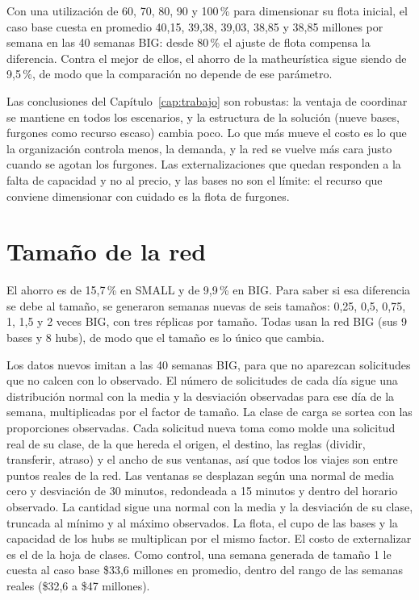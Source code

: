  Con una utilización de 60, 70, 80, 90 y 100\,\% para dimensionar su flota inicial, el caso base cuesta en promedio 40,15, 39,38, 39,03, 38,85 y 38,85 millones por semana en las 40 semanas BIG: desde 80\,\% el ajuste de flota compensa la diferencia. Contra el mejor de ellos, el ahorro de la matheurística sigue siendo de 9,5\,\%, de modo que la comparación no depende de ese parámetro.

 Las conclusiones del Capítulo~\ref{cap:trabajo} son robustas: la ventaja de coordinar se mantiene en todos los escenarios, y la estructura de la solución (nueve bases, furgones como recurso escaso) cambia poco. Lo que más mueve el costo es lo que la organización controla menos, la demanda, y la red se vuelve más cara justo cuando se agotan los furgones. Las externalizaciones que quedan responden a la falta de capacidad y no al precio, y las bases no son el límite: el recurso que conviene dimensionar con cuidado es la flota de furgones.

\section{Tamaño de la red}\label{sec:tamano}

El ahorro es de 15,7\,\% en SMALL y de 9,9\,\% en BIG. Para saber si esa diferencia se debe al tamaño, se generaron semanas nuevas de seis tamaños: 0,25, 0,5, 0,75, 1, 1,5 y 2 veces BIG, con tres réplicas por tamaño. Todas usan la red BIG (sus 9 bases y 8 hubs), de modo que el tamaño es lo único que cambia.

 Los datos nuevos imitan a las 40 semanas BIG, para que no aparezcan solicitudes que no calcen con lo observado. El número de solicitudes de cada día sigue una distribución normal con la media y la desviación observadas para ese día de la semana, multiplicadas por el factor de tamaño. La clase de carga se sortea con las proporciones observadas. Cada solicitud nueva toma como molde una solicitud real de su clase, de la que hereda el origen, el destino, las reglas (dividir, transferir, atraso) y el ancho de sus ventanas, así que todos los viajes son entre puntos reales de la red. Las ventanas se desplazan según una normal de media cero y desviación de 30 minutos, redondeada a 15 minutos y dentro del horario observado. La cantidad sigue una normal con la media y la desviación de su clase, truncada al mínimo y al máximo observados. La flota, el cupo de las bases y la capacidad de los hubs se multiplican por el mismo factor. El costo de externalizar es el de la hoja de clases. Como control, una semana generada de tamaño 1 le cuesta al caso base \$33,6 millones en promedio, dentro del rango de las semanas reales (\$32,6 a \$47 millones).


